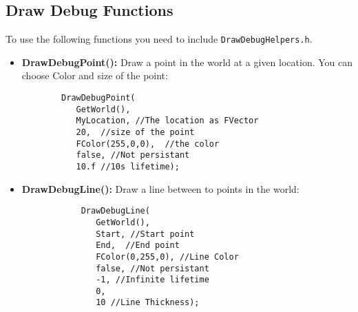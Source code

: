 \documentclass[10pt]{article}
\begin{document}
\begin{multicols*}{5}
	\subsection{Draw Debug Functions}
	To use the following functions you need to include \verb|DrawDebugHelpers.h|.
	\begin{itemize}
		\item \textbf{DrawDebugPoint():} Draw a point in the world at a given location. You can choose Color and size of the point:
		\begin{verbatim}
		DrawDebugPoint(
		   GetWorld(), 
		   MyLocation, //The location as FVector
		   20,  //size of the point
		   FColor(255,0,0),  //the color
		   false, //Not persistant
		   10.f //10s lifetime);
		\end{verbatim}
		\item \textbf{DrawDebugLine():} Draw a line between to points in  the world:
		\begin{verbatim}
			DrawDebugLine(
			   GetWorld(), 
			   Start, //Start point
			   End,  //End point
			   FColor(0,255,0), //Line Color 
			   false, //Not persistant
			   -1, //Infinite lifetime
			   0,
			   10 //Line Thickness);
		\end{verbatim}
		
	\end{itemize}
\doclicenseImage

\end{multicols*}
\end{document}
